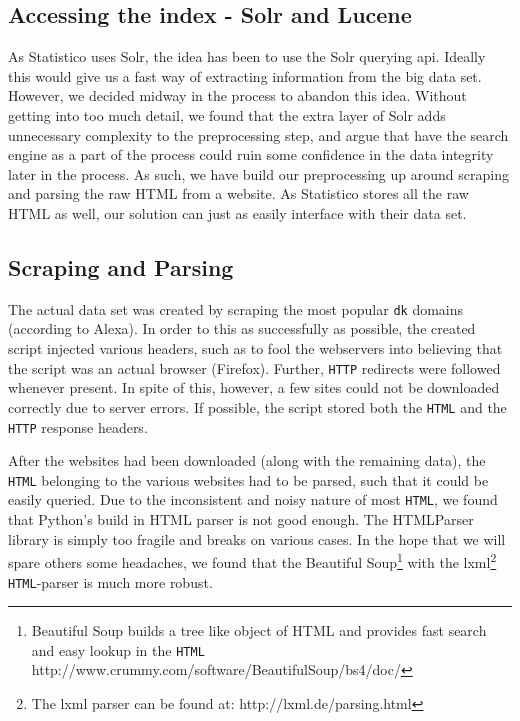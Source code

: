 \subsection{Accessing the index - Solr and Lucene}
\label{subsec:solr}
As Statistico uses Solr, the idea has been to use the Solr querying api. Ideally this would give us a fast way of extracting information from the big data set. However, we decided midway in the process to abandon this idea. Without getting into too much detail, we found that the extra layer of Solr adds unnecessary complexity to the preprocessing step, and argue that have the search engine as a part of the process could ruin some confidence in the data integrity later in the process. As such, we have build our preprocessing up around scraping and parsing the raw HTML from a website. As Statistico stores all the raw HTML as well, our solution can just as easily interface with their data set.

\subsection{Scraping and Parsing}
\label{subsec:scraping}


The actual data set was created by scraping the most popular \texttt{dk} domains (according to Alexa). In order to this as successfully as possible, the created script injected various headers, such as to fool the webservers into believing that the script was an actual browser (Firefox). Further, \texttt{HTTP} redirects were followed whenever present. In spite of this, however, a few sites could not be downloaded correctly due to server errors. If possible, the script stored both the \texttt{HTML} and the \texttt{HTTP} response headers.

After the websites had been downloaded (along with the remaining data), the \texttt{HTML} belonging to the various websites had to be parsed, such that it could be easily queried. Due to the inconsistent and noisy nature of most \texttt{HTML}, we found that Python's build in HTML parser is not good enough. The HTMLParser library is simply too fragile and breaks on various cases. In the hope that we will spare others some headaches, we found that the Beautiful Soup\footnote{Beautiful Soup builds a tree like object of HTML and provides fast search and easy lookup in the \texttt{HTML} http://www.crummy.com/software/BeautifulSoup/bs4/doc/} with the lxml\footnote{The lxml parser can be found at: http://lxml.de/parsing.html} \texttt{HTML}-parser is much more robust.
